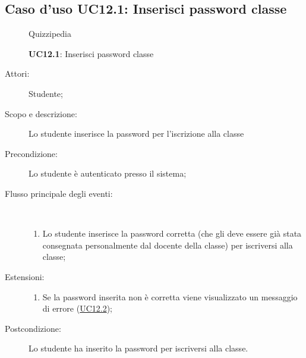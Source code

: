 \subsection{Caso d'uso UC12.1: Inserisci password classe}
\begin{figure}[H]
	\centering
	\begin{resizedtikzpicture}{\textwidth}
		\begin{umlsystem}[x=0, fill=lightgray!20]{Quizzipedia}
		\end{umlsystem}
	\end{resizedtikzpicture}
	\caption{\textbf{UC12.1}: Inserisci password classe}
	\label{UC12.1}
\end{figure}
\begin{description}
	\item[Attori:] Studente;
	\item[Scopo e descrizione:] Lo studente inserisce la password per l'iscrizione alla classe
	\item[Precondizione:] Lo studente è autenticato presso il sistema;
	
	\item[Flusso principale degli eventi:] \ 
	\begin{enumerate}
		\item Lo studente inserisce la password corretta (che gli deve essere già stata consegnata personalmente dal docente della classe) per iscriversi alla classe;
		
	\end{enumerate}
	\item[Estensioni:]
	\begin{enumerate}
		\item Se la password inserita non è corretta viene visualizzato un messaggio di errore (\hyperlink{UC12.2}{UC12.2});
		
	\end{enumerate}
	\item[Postcondizione:] Lo studente ha inserito la password per iscriversi alla classe.
\end{description}
\hypertarget{UC12.2}{}
